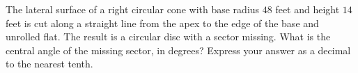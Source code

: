 The lateral surface of a right circular cone with base radius $48$ feet and height $14$ feet is cut along a straight line from the apex to the edge of the base and unrolled flat. The result is a circular disc with a sector missing. What is the central angle of the missing sector, in degrees? Express your answer as a decimal to the nearest tenth.

